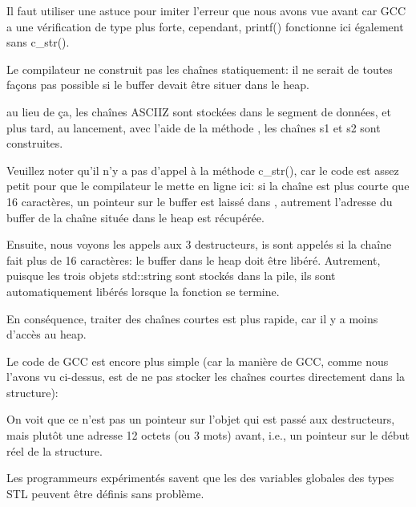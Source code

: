 Il faut utiliser une astuce pour imiter l'erreur que nous avons vue avant car GCC
a une vérification de type plus forte, cependant, printf() fonctionne ici également
sans c\_str().






Le compilateur ne construit pas les chaînes statiquement: il ne serait de toutes
façons pas possible si le buffer devait être situer dans le \gls{heap}.

au lieu de ça, les chaînes \ac{ASCIIZ} sont stockées dans le segment de données,
et plus tard, au lancement, avec l'aide de la méthode , les chaînes s1
et s2 sont construites.

Veuillez noter qu'il n'y a pas d'appel à la méthode c\_str(), car le code est assez
petit pour que le compilateur le mette en ligne ici: si la chaîne est plus courte
que 16 caractères, un pointeur sur le buffer est laissé dans \EAX, autrement l'adresse
du buffer de la chaîne située dans le \gls{heap} est récupérée.

Ensuite, nous voyons les appels aux 3 destructeurs, is sont appelés si la chaîne
fait plus de 16 caractères: le buffer dans le \gls{heap} doit être libéré.
Autrement, puisque les trois objets std::string sont stockés dans la pile, ils sont
automatiquement libérés lorsque la fonction se termine.

En conséquence, traiter des chaînes courtes est plus rapide, car il y a moins d'accès
au \gls{heap}.

Le code de GCC est encore plus simple (car la manière de GCC, comme nous l'avons
vu ci-dessus, est de ne pas stocker les chaînes courtes directement dans la structure):



On voit que ce n'est pas un pointeur sur l'objet qui est passé aux destructeurs,
mais plutôt une adresse 12 octets (ou 3 mots) avant, i.e., un pointeur sur le début
réel de la structure.

\label{sec:std_string_as_global_variable}

Les programmeurs \Cpp expérimentés savent que les des variables globales des types
\ac{STL} peuvent être définis sans problème.

